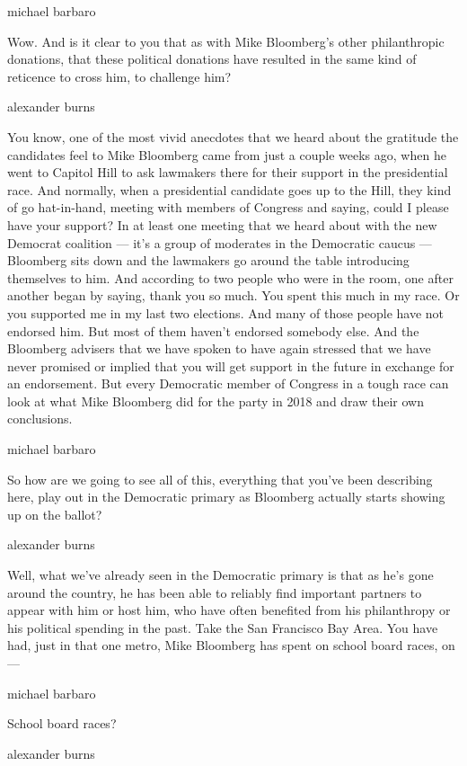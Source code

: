 michael barbaro

Wow. And is it clear to you that as with Mike Bloomberg's other
philanthropic donations, that these political donations have resulted in
the same kind of reticence to cross him, to challenge him?

alexander burns

You know, one of the most vivid anecdotes that we heard about the
gratitude the candidates feel to Mike Bloomberg came from just a couple
weeks ago, when he went to Capitol Hill to ask lawmakers there for their
support in the presidential race. And normally, when a presidential
candidate goes up to the Hill, they kind of go hat-in-hand, meeting with
members of Congress and saying, could I please have your support? In at
least one meeting that we heard about with the new Democrat coalition
--- it's a group of moderates in the Democratic caucus --- Bloomberg
sits down and the lawmakers go around the table introducing themselves
to him. And according to two people who were in the room, one after
another began by saying, thank you so much. You spent this much in my
race. Or you supported me in my last two elections. And many of those
people have not endorsed him. But most of them haven't endorsed somebody
else. And the Bloomberg advisers that we have spoken to have again
stressed that we have never promised or implied that you will get
support in the future in exchange for an endorsement. But every
Democratic member of Congress in a tough race can look at what Mike
Bloomberg did for the party in 2018 and draw their own conclusions.

michael barbaro

So how are we going to see all of this, everything that you've been
describing here, play out in the Democratic primary as Bloomberg
actually starts showing up on the ballot?

alexander burns

Well, what we've already seen in the Democratic primary is that as he's
gone around the country, he has been able to reliably find important
partners to appear with him or host him, who have often benefited from
his philanthropy or his political spending in the past. Take the San
Francisco Bay Area. You have had, just in that one metro, Mike Bloomberg
has spent on school board races, on ---

michael barbaro

School board races?

alexander burns

